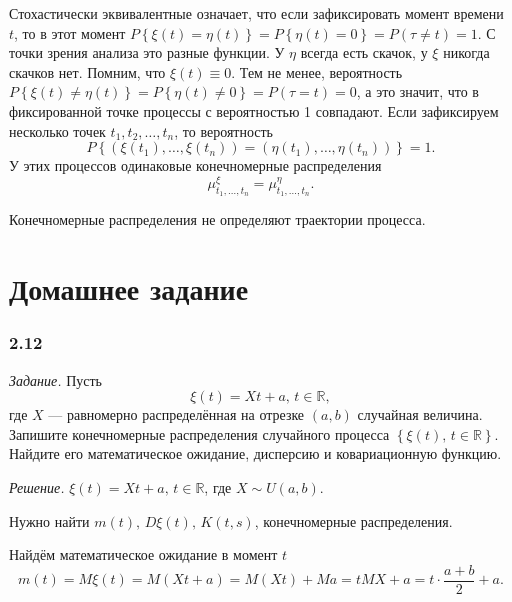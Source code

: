 Стохастически эквивалентные означает, что если зафиксировать момент времени $t$, то в этот момент
$P \left\{ \xi \left( t \right) =
  \eta \left( t \right) \right\} =
  P \left\{ \eta \left( t \right) = 0 \right\} =
  P \left( \tau \neq t \right) = 1$.
С точки зрения анализа это разные функции.
У $ \eta $ всегда есть скачок, у $ \xi $ никогда скачков нет.
Помним, что $ \xi \left( t \right) \equiv 0$.
Тем не менее, вероятность
$P \left\{ \xi \left( t \right) \neq \eta \left( t \right) \right\} =
  P \left\{ \eta \left( t \right) \neq 0 \right\} =
  P \left( \tau = t \right) =
  0$,
а это значит, что в фиксированной точке процессы с вероятностью 1 совпадают.
Если зафиксируем несколько точек $t_1, t_2, \dotsc, t_n$, то вероятность
$$P \left\{
    \left( \xi \left( t_1 \right), \dotsc, \xi \left( t_n \right) \right) =
    \left( \eta \left( t_1 \right), \dotsc, \eta \left( t_n \right) \right) \right\} =
  1.$$
У этих процессов одинаковые конечномерные распределения
$$ \mu_{t_1, \dotsc, t_n}^{ \xi } =
  \mu_{t_1, \dotsc, t_n}^{ \eta }.$$

Конечномерные распределения не определяют траектории процесса.

\section*{Домашнее задание}

\subsubsection*{2.12}

\textit{Задание.}
Пусть
$$ \xi \left( t \right) =
  Xt + a, \,
  t \in \mathbb{R},$$
где $X$ --- равномерно распределённая на отрезке $ \left( a, b \right) $ случайная величина.
Запишите конечномерные распределения случайного процесса
$ \left\{ \xi \left( t \right), \, t \in \mathbb{R} \right\} $.
Найдите его математическое ожидание, дисперсию и ковариационную функцию.

\textit{Решение.}
$ \xi \left( t \right) = Xt + a, \, t \in \mathbb{R}$, где $X \sim U \left( a, b \right) $.

Нужно найти $m \left( t \right), \, D \xi \left( t \right), \, K \left( t, s \right) $,
конечномерные распределения.

Найдём математическое ожидание в момент $t$
$$m \left( t \right) =
  M \xi \left( t \right) =
  M \left( Xt + a \right) =
  M \left( Xt \right) + Ma =
  tMX + a =
  t \cdot \frac{a + b}{2} + a.$$

